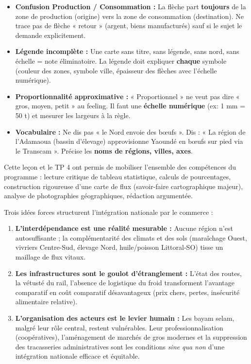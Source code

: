 \documentclass[11pt]{article}
\newcounter{popsec}
\newcounter{popsub}
\newcommand{\courssub}[1]{%
  \stepcounter{popsub}%
  \par\vspace{9pt}\noindent{\popxbold\fontsize{11.5}{13}\selectfont\color{popink}{\color{poporange}\thepopsec.\thepopsub}\hspace{6pt}#1}\par\nopagebreak\vspace{4pt}
}
\begin{document}
\begin{exoresolu}
\begin{attention}
\begin{itemize}
\item \textbf{Confusion Production / Consommation :} La flèche part \textbf{toujours} de la zone de production (origine) vers la zone de consommation (destination). Ne trace pas de flèche « retour » (argent, biens manufacturés) sauf si le sujet le demande explicitement.
\item \textbf{Légende incomplète :} Une carte sans titre, sans légende, sans nord, sans échelle = note éliminatoire. La légende doit expliquer \textbf{chaque} symbole (couleur des zones, symbole ville, épaisseur des flèches avec l'échelle numérique).
\item \textbf{Proportionnalité approximative :} « Proportionnel » ne veut pas dire « gros, moyen, petit » au feeling. Il faut une \textbf{échelle numérique} (ex: 1 mm = 50 t) et mesurer les largeurs à la règle.
\item \textbf{Vocabulaire :} Ne dis pas « le Nord envoie des bœufs ». Dis : « La région de l'Adamaoua (bassin d'élevage) approvisionne Yaoundé en bœufs sur pied via le Transcam ». Précise les \textbf{noms de régions, villes, axes}.
\end{itemize}
\end{attention}

\courssub{Bilan de la leçon et du TP 4}

Cette leçon et le TP 4 ont permis de mobiliser l'ensemble des compétences du programme : lecture critique de tableau statistique, calculs de pourcentages, construction rigoureuse d'une carte de flux (savoir-faire cartographique majeur), analyse de photographies géographiques, rédaction argumentée.

Trois idées forces structurent l'intégration nationale par le commerce :
\begin{enumerate}
\item \textbf{L'interdépendance est une réalité mesurable :} Aucune région n'est autosuffisante ; la complémentarité des climats et des sols (maraîchage Ouest, vivriers Centre-Sud, élevage Nord, huile/poisson Littoral-SO) tisse un maillage de flux vitaux.
\item \textbf{Les infrastructures sont le goulot d'étranglement :} L'état des routes, la vétusté du rail, l'absence de logistique du froid transforment l'avantage comparatif en coût comparatif désavantageux (prix chers, pertes, insécurité alimentaire relative).
\item \textbf{L'organisation des acteurs est le levier humain :} Les bayam selam, malgré leur rôle central, restent vulnérables. Leur professionnalisation (coopératives), l'aménagement de marchés de gros modernes et la suppression des tracasseries administratives sont les conditions \emph{sine qua non} d'une intégration nationale efficace et équitable.
\end{enumerate}

\end{exoresolu}
\end{document}
